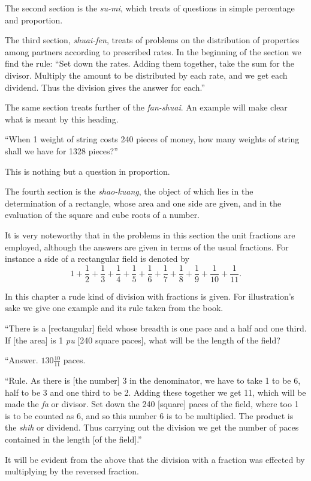 \documentclass[11pt]{article}
\newcommand{\scanpage}[2]{\clearpage\setcounter{footnote}{0}\noindent{\footnotesize\color{gray}PDF page #1 · #2}\par\medskip}
\newcommand{\scanfooter}{}
\begin{document}
The second section is the \emph{su-mi}, which treats of questions in simple percentage and proportion.
\scanfooter

\scanpage{0026}{Chapter 3, printed page 12}
The third section, \emph{shuai-fen}, treats of problems on the distribution of properties among partners according to prescribed rates. In the beginning of the section we find the rule: ``Set down the rates. Adding them together, take the sum for the divisor. Multiply the amount to be distributed by each rate, and we get each dividend. Thus the division gives the answer for each.''

The same section treats further of the \emph{fan-shuai}. An example will make clear what is meant by this heading.

``When 1 weight of string costs 240 pieces of money, how many weights of string shall we have for 1328 pieces?''

This is nothing but a question in proportion.

The fourth section is the \emph{shao-kuang}, the object of which lies in the determination of a rectangle, whose area and one side are given, and in the evaluation of the square and cube roots of a number.

It is very noteworthy that in the problems in this section the unit fractions are employed, although the answers are given in terms of the usual fractions. For instance a side of a rectangular field is denoted by
\[
1+\frac12+\frac13+\frac14+\frac15+\frac16+\frac17+\frac18+\frac19+\frac1{10}+\frac1{11}.
\]

In this chapter a rude kind of division with fractions is given. For illustration's sake we give one example and its rule taken from the book.

``There is a [rectangular] field whose breadth is one pace and a half and one third. If [the area] is 1 \emph{pu} [240 square paces], what will be the length of the field?

``Answer. $130\frac{10}{11}$ paces.

``Rule. As there is [the number] 3 in the denominator, we have to take 1 to be 6, half to be 3 and one third to be 2. Adding these together we get 11, which will be made the \emph{fa} or divisor. Set down the 240 [square] paces of the field, where too 1 is to be counted as 6, and so this number 6 is to be multiplied. The product is the \emph{shih} or dividend. Thus carrying out the division we get the number of paces contained in the length [of the field].''

It will be evident from the above that the division with a fraction was effected by multiplying by the reversed fraction.
\end{document}
